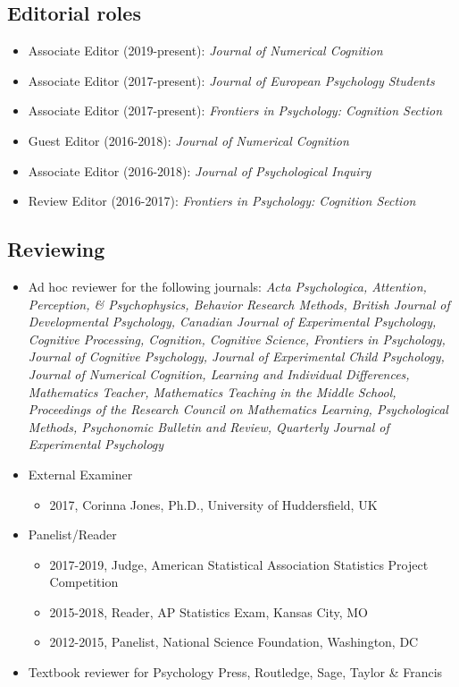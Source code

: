 \documentclass[article,10pt]{article}
\begin{document}
\subsection*{Editorial roles}
\label{sec:orge772784}
\begin{itemize}
\item Associate Editor (2019-present): \emph{Journal of Numerical Cognition}
\item Associate Editor (2017-present): \emph{Journal of European Psychology Students}
\item Associate Editor (2017-present): \emph{Frontiers in Psychology: Cognition Section}
\item Guest Editor (2016-2018): \emph{Journal of Numerical Cognition}
\item Associate Editor (2016-2018): \emph{Journal of Psychological Inquiry}
\item Review Editor (2016-2017): \emph{Frontiers in Psychology: Cognition Section}
\end{itemize}
\subsection*{Reviewing}
\label{sec:org8a48a3a}

\begin{itemize}
\item Ad hoc reviewer for the following journals: \emph{Acta Psychologica, Attention, Perception, \& Psychophysics, Behavior Research Methods, British Journal of Developmental Psychology, Canadian Journal of Experimental Psychology, Cognitive Processing, Cognition, Cognitive Science, Frontiers in Psychology, Journal of Cognitive Psychology, Journal of Experimental Child Psychology, Journal of Numerical Cognition, Learning and Individual Differences, Mathematics Teacher, Mathematics Teaching in the Middle School, Proceedings of the Research Council on Mathematics Learning, Psychological Methods, Psychonomic Bulletin and Review, Quarterly Journal of Experimental Psychology}
\item External Examiner
\begin{itemize}
\item 2017, Corinna Jones, Ph.D., University of Huddersfield, UK
\end{itemize}
\item Panelist/Reader
\begin{itemize}
\item 2017-2019, Judge, American Statistical Association Statistics Project Competition
\item 2015-2018, Reader, AP Statistics Exam, Kansas City, MO
\item 2012-2015, Panelist, National Science Foundation, Washington, DC
\end{itemize}

\item Textbook reviewer for Psychology Press, Routledge, Sage, Taylor \& Francis
\end{itemize}
\end{document}
